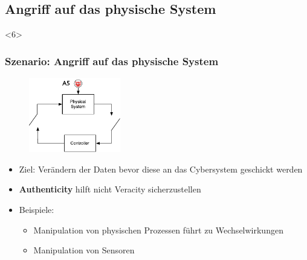 \documentclass{sikslides}
\begin{document}
    \subsection{Angriff auf das physische System}
    \begin{frame}
        <6>
        \frametitle{Szenario: Angriff auf das physische System}
        \begin{figure}
            \centering
            \includegraphics[width=4cm]{figure/physical}
        \end{figure}
        \begin{itemize}
            \item Ziel: Verändern der Daten bevor diese an das Cybersystem geschickt werden
            \item \textbf{Authenticity} hilft nicht Veracity sicherzustellen
            \item Beispiele:
            \begin{itemize}
                \item Manipulation von physischen Prozessen führt zu Wechselwirkungen
                \item Manipulation von Sensoren
            \end{itemize}
        \end{itemize}
    \end{frame}


\end{document}
